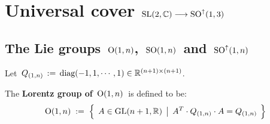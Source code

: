 

\chapter{Universal cover $\textnormal{SL}(2,\mathbb{C}) \longrightarrow \textnormal{SO}^{\uparrow}(1,3)$}
\setcounter{theorem}{0}
\setcounter{equation}{0}


\renewcommand{\theenumi}{\roman{enumi}}
\renewcommand{\labelenumi}{\textnormal{(\theenumi)}$\;\;$}


\section{The Lie groups \,$\textnormal{O}(1,n)$,\, $\textnormal{SO}(1,n)$\, and \,$\textnormal{SO}^{\uparrow}(1,n)$}



Let \,$Q_{(1,n)} \,:=\, \textnormal{diag}(-1,1,\cdots,1) \in \mathbb{R}^{(n+1) \times (n+1)}$.

\vskip 0.5cm
\begin{definition}[$\textnormal{O}(1,n)$]
\mbox{}
\vskip 0.1cm
\noindent
The \textbf{Lorentz group of \,$\textnormal{O}(1,n)$}\, is defined to be:
\begin{equation*}
\textnormal{O}(1,n)
\; := \;
	\left\{\;\,
		A \overset{{\color{white}.}}{\in} \textnormal{GL}(n+1,\Re)
		\;\left\vert\;\,
			A^{T} \cdot Q_{(1,n)} \cdot A = Q_{(1,n)}
			\right.
		\;\right\}
\end{equation*}
\end{definition}

